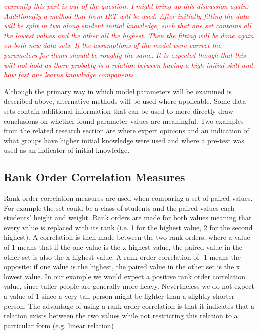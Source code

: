 \documentclass{scrartcl}
\newcommand\todo[1]{\textit{\textcolor{red}{#1}}}
\begin{document}
\todo{currently this part is out of the question. I might bring up this discussion again:
Additionally a method that from IRT \cite{hambleton} will be used. After initially fitting the data will be split in two along student initial knowledge, such that one set contains all the lowest values and the other all the highest. Then the fitting will be done again on both new data-sets. If the assumptions of the model were correct the parameters for items should be roughly the same. It is expected though that this will not hold as there probably is a relation between having a high initial skill and how fast one learns knowledge components}

Although the primary way in which model parameters will be examined is described above, alternative methods will be used where applicable. Some data-sets contain additional information that can be used to more directly draw conclusions on whether found parameter values are meaningful. Two examples from the related research section are \cite{eirt} where expert opinions and an indication of what groups have higher initial knowledge were used and \cite{ktpfa} where a pre-test was used as an indicator of initial knowledge.

\subsection{Rank Order Correlation Measures}
Rank order correlation measures are used when comparing a set of paired values. For example the set could be a class of students and the paired values each students' height and weight. Rank orders are made for both values meaning that every value is replaced with its rank (i.e. 1 for the highest value, 2 for the second highest). A correlation is then made between the two rank orders, where a value of 1 means that if the one value is the x highest value, the paired value in the other set is also the x highest value. A rank order correlation of -1 means the opposite: if one value is the  highest, the paired value in the other set is the x lowest value. In our example we would expect a positive rank order correlation value, since taller people are generally more heavy. Nevertheless we do not expect a value of 1 since a very tall person might be lighter than a slightly shorter person. The advantage of using a rank order correlation is that it indicates that a relation exists between the two values while not restricting this relation to a particular form (e.g. linear relation)
\end{document}
